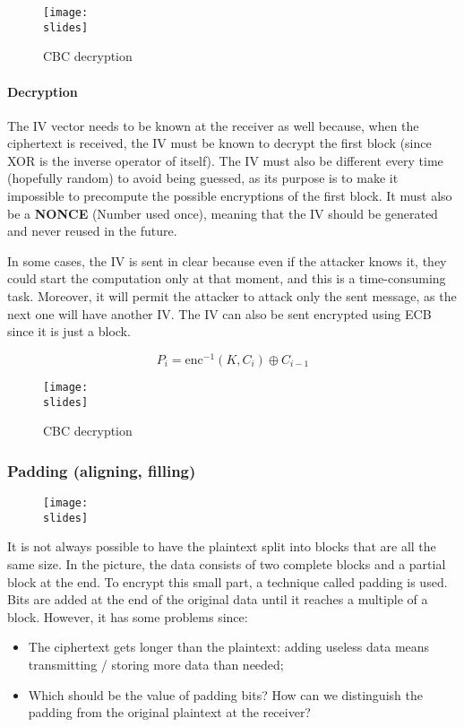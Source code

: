 \begin{figure}[H]
    \centering
    \texttt{[image: \\slides]}
    \caption*{CBC decryption}
\end{figure}


\paragraph*{Decryption}
The IV vector needs to be known at the receiver as well because, when the ciphertext is received, the IV must be known to decrypt the first block (since XOR is the inverse operator of itself). 
The IV must also be different every time (hopefully random) to avoid being guessed, as its purpose is to make it impossible to precompute the possible encryptions of the first block. 
It must also be a \textbf{NONCE} (Number used once), meaning that the IV should be generated and never reused in the future.

In some cases, the IV is sent in clear because even if the attacker knows it, they could start the computation only at that moment, and this is a time-consuming task. Moreover, it will permit the attacker to attack only the sent message, as the next one will have another IV. 
The IV can also be sent encrypted using ECB since it is just a block.

\[
    P_i = \text{enc}^{-1}(K, C_i ) \oplus C_{i-1}
\]

\begin{figure}[H]
    \centering
    \texttt{[image: \\slides]}
    \caption*{CBC decryption}
\end{figure}



\subsubsection*{Padding (aligning, filling)}
\begin{figure}[H]
    \centering
    \texttt{[image: \\slides]}
\end{figure}
It is not always possible to have the plaintext split into blocks that are all the same size. In the picture, the data consists of two complete blocks and a partial block at the end. To encrypt this small part, a technique called padding is used. Bits are added at the end of the original data until it reaches a multiple of a block.
However, it has some problems since:
\begin{itemize}
    \item The ciphertext gets longer than the plaintext: adding useless data means transmitting / storing more data
    than needed;
    \item Which should be the value of padding bits? How can we distinguish the padding from the original
    plaintext at the receiver?
\end{itemize}

